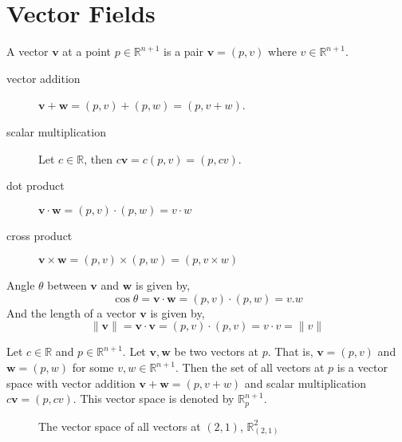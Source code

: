 \section{Vector Fields}
\begin{definition}
	A vector $\mathbf{v}$ at a point $p \in \mathbb{R}^{n+1}$ is a pair $\mathbf{v} = (p,v)$ where $v \in \mathbb{R}^{n+1}$.
\end{definition}
\begin{description}
	\item[vector addition] $\mathbf{v} + \mathbf{w} = (p,v) + (p,w) = (p,v+w)$.
	\item[scalar multiplication] Let $c \in \mathbb{R}$, then $c \mathbf{v} =  c(p,v) = (p,cv)$.
	\item[dot product] $\mathbf{v}\cdot \mathbf{w} = (p,v)\cdot(p,w) = v \cdot w$
	\item[cross product] $\mathbf{v}\times \mathbf{w} = (p,v)\times(p,w) = (p,v \times w)$
\end{description}
\begin{remark}
	Angle $\theta$ between $\mathbf{v}$ and $\mathbf{w}$ is given by,
	\begin{equation}
		\cos \theta = \mathbf{v}\cdot\mathbf{w} = (p,v)\cdot(p,w) = v.w
	\end{equation}
	And the length of a vector $\mathbf{v}$ is given by,
	\begin{equation}
		\|\mathbf{v}\| = \mathbf{v}\cdot\mathbf{v} = (p,v)\cdot(p,v) = v\cdot v = \| v \|
	\end{equation}
\end{remark}

\begin{remark}
	Let $c \in \mathbb{R}$ and $p \in \mathbb{R}^{n+1}$.
	Let $\mathbf{v}, \mathbf{w}$ be two vectors at $p$.
	That is, $\mathbf{v} = (p,v)$ and $\mathbf{w} = (p,w)$ for some $v,w \in \mathbb{R}^{n+1}$.
	Then the set of all vectors at $p$ is a vector space with vector addition $\mathbf{v}+\mathbf{w} = (p,v+w)$ and scalar multiplication $c\mathbf{v} = (p,cv)$.
	This vector space is denoted by $\mathbb{R}_p^{n+1}$.
\end{remark}

\begin{figure}[h]
	\centering
	\caption{The vector space of all vectors at $(2,1)$, $\mathbb{R}_{(2,1)}^2$}
\end{figure}

